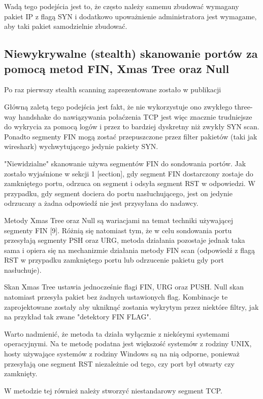 Wadą tego podejścia jest to, że często należy samemu zbudować wymagany pakiet IP z flagą SYN i dodatkowo upoważnienie administratora jest wymagame, aby taki pakiet samodzielnie zbudować. 


\subsection{Niewykrywalne (stealth) skanowanie portów za pomocą metod FIN, Xmas Tree oraz Null}

Po raz pierwszy stealth scanning zaprezentowane zostało w publikacji \cite{}


Główną zaletą tego podejścia jest fakt, że nie wykorzystuje ono zwykłego three-way handshake do nawiązywania połaćzenia TCP jest więc znacznie trudniejsze do wykrycia za pomocą logów i przez to bardziej dyskretny niż zwykły SYN scan. Ponadto segmenty FIN mogą zostać przepuszczone przez filter pakietów (taki jak wireshark) wychwytującego jedynie pakiety SYN.

"Niewidzialne" skanowanie używa segmentów FIN do sondowania portów. Jak zostało wyjaśnione w sekcji 1 [section], gdy segment FIN dostarczony zostaje do zamkniętego portu, odrzuca on segment i odsyła segment RST w odpowiedzi. W przypadku, gdy segment dociera do portu nasłuchującego, jest on jedynie odrzucany a żadna odpowiedź nie jest przysyłana do nadawcy.


Metody Xmas Tree oraz Null są wariacjami na temat techniki używającej segmenty FIN \cite{} [9]. Różnią się natomiast tym, że w celu sondowania portu przesyłają segmenty PSH oraz URG, metoda działania pozostaje jednak taka sama i opiera się na mechanizmie działania metody FIN scan (odpowiedź z flagą RST w przypadku zamkniętego portu lub odrzucenie pakietu gdy port nasłuchuje). 

Skan Xmas Tree ustawia jednocześnie flagi FIN, URG oraz PUSH. Null skan natomiast przesyła pakiet bez żadnych ustawionych flag. Kombinacje te zaprojektowane zostały aby ukniknąć zostania wykrytym przez niektóre filtry, jak na przykład tak zwane "detektory FIN FLAG".


Warto nadmienić, że metoda ta działa wyłącznie z niekórymi systemami operacyjnymi. Na te metodę podatna jest większość systemów z rodziny UNIX, hosty używające systemów z rodziny Windows są na nią odporne, ponieważ przesyłają one segment RST niezależnie od tego, czy port był otwarty czy zamknięty.

W metodzie tej również należy stworzyć niestandarowy segment TCP.
